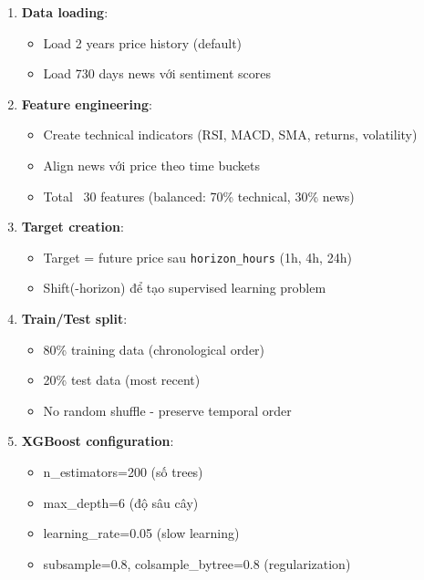 \begin{enumerate}
    \item \textbf{Data loading}:
    \begin{itemize}
        \item Load 2 years price history (default)
        \item Load 730 days news với sentiment scores
    \end{itemize}
    
    \item \textbf{Feature engineering}:
    \begin{itemize}
        \item Create technical indicators (RSI, MACD, SMA, returns, volatility)
        \item Align news với price theo time buckets
        \item Total ~30 features (balanced: 70\% technical, 30\% news)
    \end{itemize}
    
    \item \textbf{Target creation}:
    \begin{itemize}
        \item Target = future price sau \texttt{horizon\_hours} (1h, 4h, 24h)
        \item Shift(-horizon) để tạo supervised learning problem
    \end{itemize}
    
    \item \textbf{Train/Test split}:
    \begin{itemize}
        \item 80\% training data (chronological order)
        \item 20\% test data (most recent)
        \item No random shuffle - preserve temporal order
    \end{itemize}
    
    \item \textbf{XGBoost configuration}:
    \begin{itemize}
        \item n\_estimators=200 (số trees)
        \item max\_depth=6 (độ sâu cây)
        \item learning\_rate=0.05 (slow learning)
        \item subsample=0.8, colsample\_bytree=0.8 (regularization)
    \end{itemize}
    

\end{enumerate}
